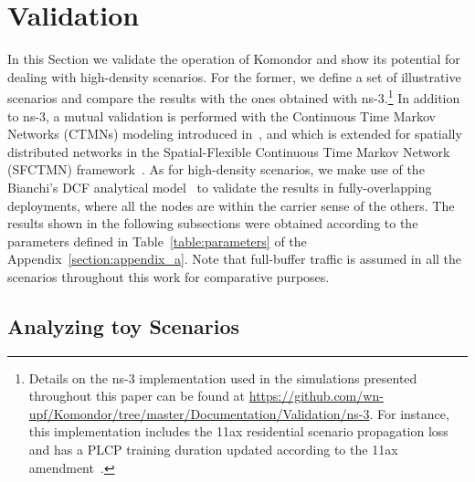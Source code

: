 \documentclass[conference]{IEEEtran}
\begin{document}
	\section{Validation}
	\label{section:validations}
	In this Section we validate the operation of Komondor and show its potential for dealing with high-density scenarios. For the former, we define a set of illustrative scenarios and compare the results with the ones obtained with ns-3.\footnote{Details on the ns-3 implementation used in the simulations presented throughout this paper can be found at \url{https://github.com/wn-upf/Komondor/tree/master/Documentation/Validation/ns-3}. For instance, this implementation includes the 11ax residential scenario propagation loss~\cite{pathloss11ax} and has a PLCP training duration updated according to the 11ax amendment~\cite{tgax2017draft}.} In addition to ns-3, a mutual validation is performed with the Continuous Time Markov Networks (CTMNs) modeling introduced in~\cite{bellalta2014throughput}, and which is extended for spatially distributed networks in the Spatial-Flexible Continuous Time Markov Network (SFCTMN) framework~\cite{barrachina2018performance}. As for high-density scenarios, we make use of the Bianchi's DCF analytical model~\cite{bianchi2000performance} to validate the results in fully-overlapping deployments, where all the nodes are within the carrier sense of the others. The results shown in the following subsections were obtained according to the parameters defined in Table~\ref{table:parameters} of the Appendix~\ref{section:appendix_a}. Note that full-buffer traffic is assumed in all the scenarios throughout this work for comparative purposes.
	
	\subsection{Analyzing toy Scenarios}
	
\end{document}
